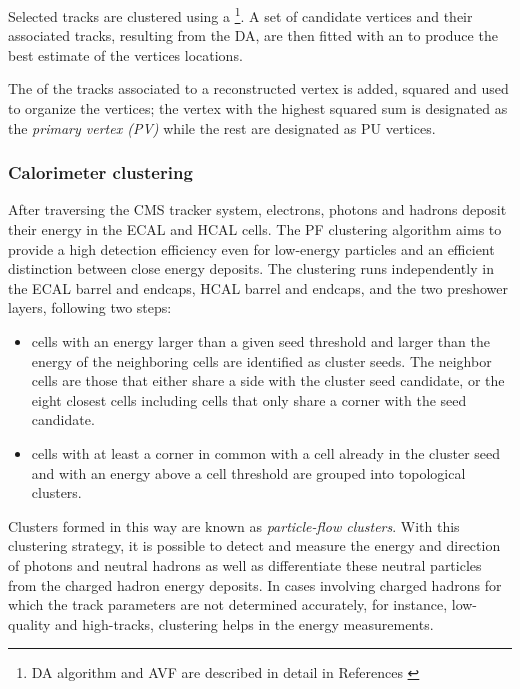Selected tracks are clustered using a \footnote{DA algorithm and AVF are described in detail in References \cite{da, avf}}. A set of candidate vertices and their associated tracks, resulting from the DA, are then fitted with an  to produce the best estimate of the vertices locations.

The \pt of the tracks associated to a reconstructed vertex is added, squared and used to organize the vertices; the vertex with the highest squared sum is designated as the \textit{primary vertex (PV)} while the rest are designated as PU vertices. 

\subsubsection*{Calorimeter clustering}

After traversing the CMS tracker system, electrons, photons and hadrons deposit their energy in the ECAL and HCAL cells. The PF clustering algorithm aims to provide a high detection efficiency even for low-energy particles and an efficient distinction between close energy deposits. The clustering runs independently in the ECAL barrel and endcaps, HCAL barrel and endcaps, and the two preshower layers, following two steps:
\begin{itemize}
\item cells with an energy larger than a given seed threshold and larger than the energy of the neighboring cells are identified as cluster seeds. The neighbor cells are those that either share a side with the cluster seed candidate, or the eight closest cells including cells that only share a corner with the seed candidate.
\item cells with at least a corner in common with a cell already in the cluster seed and with an energy above a cell threshold are grouped into topological clusters.
\end{itemize}

Clusters formed in this way are known as \textit{particle-flow clusters}. With this clustering strategy, it is possible to detect and measure the energy and direction of photons and neutral hadrons as well as differentiate these neutral particles from the charged hadron energy deposits. In cases involving charged hadrons for which the track parameters are not determined accurately, for instance, low-quality and high-\pt tracks, clustering helps in the energy measurements. 

